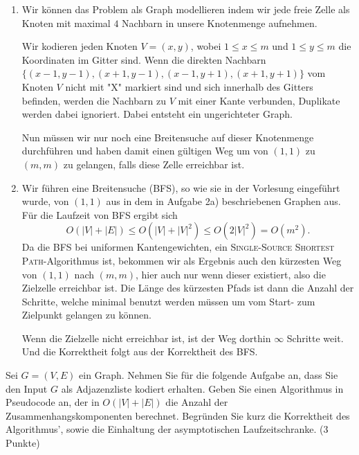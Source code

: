 \documentclass[ngerman,landscape,twocolumn]{adtexsheet}
\begin{document}
\begin{solution}
    \begin{enumerate}
        \item  Wir können das Problem als Graph modellieren indem wir jede freie Zelle als Knoten mit maximal $4$ Nachbarn in unsere Knotenmenge aufnehmen.

        Wir kodieren jeden Knoten $V=(x,y)$, wobei $1 \leq x \leq m$ und $1 \leq y \leq m$ die Koordinaten im Gitter sind. Wenn die direkten Nachbarn $\{(x-1,y-1),(x+1,y-1),(x-1,y+1),(x+1,y+1) \}$ vom Knoten $V$ nicht mit "X" markiert sind und sich innerhalb des Gitters befinden, werden die Nachbarn zu $V$ mit einer Kante verbunden, Duplikate werden dabei ignoriert. Dabei entsteht ein ungerichteter Graph.

        Nun müssen wir nur noch eine Breitensuche auf dieser Knotenmenge durchführen und haben damit einen gültigen Weg um von $(1,1)$ zu $(m,m)$ zu gelangen, falls diese Zelle erreichbar ist.
        
        \item Wir führen eine Breitensuche (\textsc{BFS}), so wie sie in der Vorlesung eingeführt wurde, von $(1,1)$ aus in dem in Aufgabe 2a) beschriebenen Graphen aus. Für die Laufzeit von \textsc{BFS} ergibt sich 
        $$O(|V|+|E|) \leq O(|V|+|V|^2) \leq O(2|V|^2) = O(m^2).$$
        Da die \textsc{BFS} bei uniformen Kantengewichten, ein \textsc{Single-Source Shortest Path}-Algorithmus ist, bekommen wir als Ergebnis auch den kürzesten Weg von $(1,1)$ nach $(m,m)$, hier auch nur wenn dieser existiert, also die Zielzelle erreichbar ist. Die Länge des kürzesten Pfads ist dann die Anzahl der Schritte, welche minimal benutzt werden müssen um vom Start- zum Zielpunkt gelangen zu können.
        
        Wenn die Zielzelle nicht erreichbar ist, ist der Weg dorthin $\infty$ Schritte weit. Und die Korrektheit folgt aus der Korrektheit des \textsc{BFS}. \hfill \qedsymbol
        
    \end{enumerate}
\end{solution}

\begin{question}
Sei $G = (V, E)$ ein Graph. Nehmen Sie für die folgende Aufgabe an, dass Sie den Input $G$ als Adjazenzliste kodiert erhalten. Geben Sie einen Algorithmus in Pseudocode an, der in $O(|V | + |E|)$ die Anzahl der Zusammenhangskomponenten berechnet. Begründen Sie kurz die Korrektheit des Algorithmus', sowie die Einhaltung der asymptotischen Laufzeitschranke. (3 Punkte)
\end{question}
\end{document}
